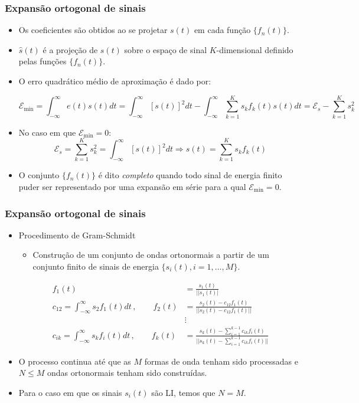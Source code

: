 \begin{frame}
	\frametitle{Expansão ortogonal de sinais}

	\begin{itemize}
		\item Os coeficientes são obtidos ao se projetar $s(t)$ em cada função $\{f_n(t)\}$.
		\item $\hat{s}(t)$ é a projeção de $s(t)$ sobre o espaço de sinal $K$-dimensional definido pelas funções $\{f_n(t)\}$.
		\item O erro quadrático médio de aproximação é dado por:
		\begin{small}\begin{equation*}
			\mathcal{E}_{\text{min}} = \int_{-\infty}^{\infty} e(t) s(t) dt = \int_{-\infty}^{\infty} [s(t)]^2 dt - \int_{-\infty}^{\infty} \sum_{k=1}^{K} s_k f_k(t) s(t) dt = \mathcal{E}_s - \sum_{k=1}^{K} s_k^2
		\end{equation*}		\end{small}
		\item No caso em que $\mathcal{E}_{\text{min}}=0$:
		\begin{equation*}
			\mathcal{E}_s = \sum_{k=1}^{K} s_k^2 = \int_{-\infty}^{\infty} [s(t)]^2 dt \Longrightarrow s(t) = \sum_{k=1}^{K} s_kf_k(t)
		\end{equation*}
		\item O conjunto $\{f_n(t) \}$ é dito \textit{completo} quando todo sinal de energia finito puder ser representado por uma expansão em série para a qual $\mathcal{E}_{\text{min}}=0$.
	\end{itemize}
\end{frame}

\begin{frame}
	\frametitle{Expansão ortogonal de sinais}

	\begin{itemize}
	  \item Procedimento de Gram-Schmidt
	  \begin{itemize}
	   \item Construção de um conjunto de ondas ortonormais a partir de um conjunto finito de sinais de energia $\{s_i(t), i=1,\ldots,M\}$.
	    \end{itemize}
	  \begin{align*}
		    f_1(t) &= \frac{s_1(t)}{||s_1(t)|} \\
		    c_{12} = \int_{-\infty}^{\infty} s_2 f_1(t) dt \, , \qquad f_2(t) &= \frac{s_2(t) - c_{12}f_1(t)}{|| s_2(t) - c_{12}f_1(t) ||} \\
		    &\vdots \\
		    c_{ik} = \int_{-\infty}^{\infty} s_k f_i(t) dt \, , \qquad f_k(t) &= \frac{s_k(t) - \sum_{i=1}^{k-1} c_{ik}f_i(t)}{|| s_k(t) - \sum_{i=1}^{k-1} c_{ik}f_i(t) ||}
	  \end{align*}
	    \item O processo continua até que as $M$ formas de onda tenham sido processadas e $N\leq M$ ondas ortonormais tenham sido construídas.
	    \item Para o caso em que os sinais $s_i(t)$ são LI, temos que $N=M$.
	\end{itemize}

\end{frame}

